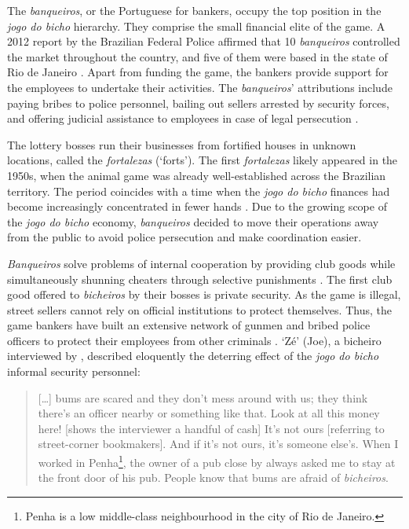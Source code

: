 \documentclass[a4paper,12pt]{article}
\begin{document}
The \textit{banqueiros}, or the Portuguese for bankers, occupy the top position in the \textit{jogo do bicho} hierarchy. They comprise the small financial elite of the game. A 2012 report by the Brazilian Federal Police affirmed that 10 \textit{banqueiros} controlled the market throughout the country, and five of them were based in the state of Rio de Janeiro \citep{globo2012contraventores}. Apart from funding the game, the bankers provide support for the employees to undertake their activities. The \textit{banqueiros}' attributions include paying bribes to police personnel, bailing out sellers arrested by security forces, and offering judicial assistance to employees in case of legal persecution \citep[75]{labronici2012paratodos}.

The lottery bosses run their businesses from fortified houses in unknown locations, called the \textit{fortalezas} (`forts'). The first \textit{fortalezas} likely appeared in the 1950s, when the animal game was already well-established across the Brazilian territory. The period coincides with a time when the \textit{jogo do bicho} finances had become increasingly concentrated in fewer hands \citep[259]{chazkel2011laws}. Due to the growing scope of the \textit{jogo do bicho} economy, \textit{banqueiros} decided to move their operations away from the public to avoid police persecution and make coordination easier. 

\textit{Banqueiros} solve problems of internal cooperation by providing club goods \citep{buchanan1965economic} while simultaneously shunning cheaters through selective punishments \citep{bo2005cooperation, roth1978equilibrium}. The first club good offered to \textit{bicheiros} by their bosses is private security. As the game is illegal, street sellers cannot rely on official institutions to protect themselves. Thus, the game bankers have built an extensive network of gunmen and bribed police officers to protect their employees from other criminals \citetext{\citealp[48]{chinelli1993vazio}; \citealp[51]{labronici2012paratodos}}. `Zé' (Joe), a bicheiro interviewed by \citet[52]{labronici2012paratodos}, described eloquently the deterring effect of the \emph{jogo do bicho} informal security personnel:

\begin{quote}
 [\dots] bums are scared and they don't mess around with us; they think there's an officer nearby or something like that. Look at all this money here! [shows the interviewer a handful of cash] It's not ours [referring to street-corner bookmakers]. And if it's not ours, it's someone else's. When I worked in Penha\footnote{Penha is a low middle-class neighbourhood in the city of Rio de Janeiro.}, the owner of a pub close by always asked me to stay at the front door of his pub. People know that bums are afraid of \emph{bicheiros}.
\end{quote}
\end{document}
